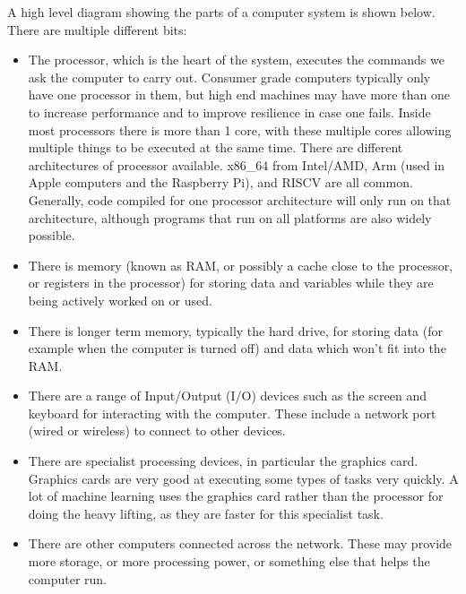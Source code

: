 \documentclass[letterpaper,10pt,british]{sphinxmanual}
\begin{document}
\sphinxAtStartPar
A high level diagram showing the parts of a computer system is shown below. There are multiple different bits:
\begin{itemize}
\item {} 
\sphinxAtStartPar
The processor, which is the heart of the system, executes the commands we ask the computer to carry out. Consumer grade computers typically only have one processor in them, but high end machines may have more than one to increase performance and to improve resilience in case one fails. Inside most processors there is more than 1 core, with these multiple cores allowing multiple things to be executed at the same time. There are different architectures of processor available. x86\_64 from Intel/AMD, Arm (used in Apple computers and the Raspberry Pi), and RISC\sphinxhyphen{}V are all common. Generally, code compiled for one processor architecture will only run on that architecture, although programs that run on all platforms are also widely possible.

\item {} 
\sphinxAtStartPar
There is memory (known as RAM, or possibly a cache close to the processor, or registers in the processor) for storing data and variables while they are being actively worked on or used.

\item {} 
\sphinxAtStartPar
There is longer term memory, typically the hard drive, for storing data (for example when the computer is turned off) and data which won’t fit into the RAM.

\item {} 
\sphinxAtStartPar
There are a range of Input/Output (I/O) devices such as the screen and keyboard for interacting with the computer. These include a network port (wired or wireless) to connect to other devices.

\item {} 
\sphinxAtStartPar
There are specialist processing devices, in particular the graphics card. Graphics cards are very good at executing some types of tasks very quickly. A lot of machine learning uses the graphics card rather than the processor for doing the heavy lifting, as they are faster for this specialist task.

\item {} 
\sphinxAtStartPar
There are other computers connected across the network. These may provide more storage, or more processing power, or something else that helps the computer run.

\end{itemize}
\end{document}
